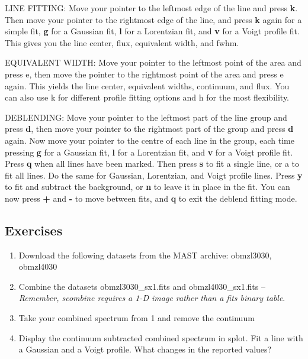 LINE FITTING: Move your pointer to the leftmost edge of the line and press {\bf k}. Then move your pointer to the rightmost edge of the line, and press {\bf k} again for a simple fit, {\bf g} for a Gaussian fit, {\bf l} for a Lorentzian fit, and {\bf v} for a Voigt profile fit. This gives you the line center, flux, equivalent width, and fwhm.

EQUIVALENT WIDTH: Move your pointer to the leftmost point of the area and press e, then move the pointer to the rightmost point of the area and press e again. This yields the line center, equivalent widths, continuum, and flux. You can also use k for different profile fitting options and h for the most flexibility.

DEBLENDING: Move your pointer to the leftmost part of the line group and press {\bf d}, then move your pointer to the rightmost part of the group and press {\bf d} again. Now move your pointer to the centre of each line in the group, each time pressing {\bf g} for a Gaussian fit, {\bf l} for a Lorentzian fit, and {\bf v} for a Voigt profile fit. Press {\bf q} when all lines have been marked. Then press {\bf s} to fit a single line, or a to fit all lines. Do the same for Gaussian, Lorentzian, and Voigt profile lines. Press {\bf y} to fit and subtract the background, or {\bf n} to leave it in place in the fit. You can now press {\bf +} and {\bf -} to move between fits, and {\bf q} to exit the deblend fitting mode.


\subsection{Exercises}
\begin{enumerate}

\item Download the following datasets from the MAST archive: obmzl3030, obmzl4030
\item Combine the datasets obmzl3030\_sx1.fits and obmzl4030\_sx1.fits -- \emph{Remember, scombine requires a 1-D image rather than a fits binary table}.
\item Take your combined spectrum from 1 and remove the continuum
\item Display the continuum subtracted combined spectrum in splot. Fit a line with a Gaussian and a Voigt profile. What changes in the reported values?
\end{enumerate}